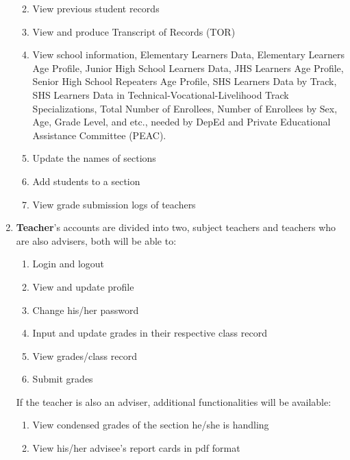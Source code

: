 \documentclass[11pt,a4paper,titlepage]{article}
\begin{document}
\begin{enumerate}
\begin{enumerate}
\begin{enumerate}
        \end{enumerate}
        \item View previous student records
        \item View and produce Transcript of Records (TOR)
        \item View school information, Elementary Learners Data, Elementary Learners Age Profile, Junior High School Learners Data, JHS Learners Age Profile, Senior High School Repeaters Age Profile, SHS Learners Data by Track, SHS Learners Data in Technical-Vocational-Livelihood Track Specializations, Total Number of Enrollees, Number of Enrollees by Sex, Age, Grade Level, and etc., needed by DepEd and Private Educational Assistance Committee (PEAC).
        \item Update the names of sections
        \item Add students to a section
        \item View grade submission logs of teachers
    \end{enumerate}
    \item \textbf{Teacher}'s accounts are divided into two, subject teachers and teachers who are also advisers, both will be able to: 
    \begin{enumerate}
        \item Login and logout
        \item View and update profile
        \item Change his/her password
        \item Input and update grades in their respective class record
        \item View grades/class record
        \item Submit grades
    \end{enumerate}

    If the teacher is also an adviser, additional functionalities will be available:

    \begin{enumerate}
        \item View condensed grades of the section he/she is handling
        \item View his/her advisee's report cards in pdf format
        

\end{enumerate}
\end{enumerate}
\end{document}
